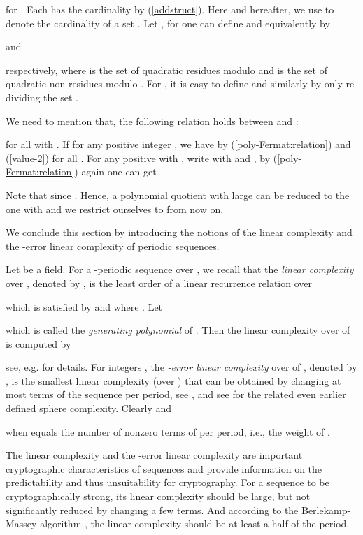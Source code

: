 \documentclass [11pt,a4paper]{article}
\begin{document}
for . Each  has the cardinality  by (\ref{addstruct}). Here and hereafter, we use  to denote the cardinality of a set . Let , for 
one can define   and  equivalently by

and

respectively, where  is the set of quadratic residues modulo  and  is the set of quadratic non-residues modulo .
For , it is easy to  define   and  similarly by only re-dividing the set .




We need to mention that,  the following relation holds  between
 and :

for all  with .
If  for any positive integer , we have  by
(\ref{poly-Fermat:relation}) and (\ref{value-2})  for all .
For any positive  with , write  with
 and , by (\ref{poly-Fermat:relation})
again one can get

Note that  since  . Hence, a polynomial quotient  with large  can be reduced to the one with  and we restrict ourselves to
 from now on.


We conclude this section by introducing the notions of the linear complexity and the -error linear complexity of periodic sequences.

Let  be a field.  For a -periodic
sequence  over , we recall that the
\emph{linear complexity} over , denoted by  , is the least order  of a linear
recurrence relation over 

which is satisfied by  and where .
Let

which is called the \emph{generating polynomial} of . Then the linear
complexity over  of  is computed by

see, e.g. \cite{LN} for details. For integers , the \emph{-error linear complexity} over  of , denoted by , is the smallest linear complexity (over ) that can be
obtained by changing at most  terms of the sequence per period, see \cite{SM,Meidl}, and see \cite{DXS} for the related even earlier defined sphere complexity.  Clearly  and

when  equals the number of nonzero terms of  per period, i.e., the weight of .


The linear complexity and the -error linear complexity are important cryptographic characteristics of sequences
and provide information on the predictability and thus unsuitability for cryptography. For a sequence to be cryptographically strong, its linear complexity
should be large, but not significantly reduced by changing a few
terms. And according to  the Berlekamp-Massey
algorithm \cite{Massey}, the linear complexity
should be at least a half of the period.
\end{document}
